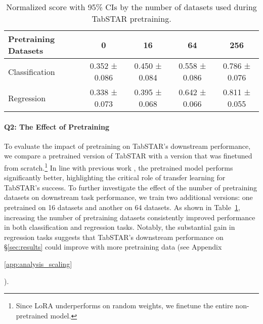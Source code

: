 \documentclass{article}
\newif\ifappendicesincluded
\newcommand{\appref}[1]{%
  \ifappendicesincluded
    \ref{#1}%
  \else
    \ref*{#1}%
  \fi
}
\begin{document}
\begin{table}[ht]
\centering
\caption{Normalized score with 95\% CIs by the number of datasets used during TabSTAR pretraining.}
\label{tab:scaling_laws}
\begin{tabular}{lcccc}
\toprule
Pretraining Datasets & 0     & 16     & 64     & 256   \\
\midrule
Classification   & 0.352 ± 0.086 & 0.450 ± 0.084  & 0.558 ± 0.086  & 0.786 ± 0.076 \\
Regression  & 0.338 ± 0.073 & 0.395 ± 0.068 & 0.642 ± 0.066 & 0.811 ± 0.055 \\
\bottomrule
\end{tabular}
\end{table}

\paragraph{Q2: The Effect of Pretraining}\label{analysis:scaling}

To evaluate the impact of pretraining on TabSTAR's downstream performance, we compare a pretrained version of TabSTAR with a version that was finetuned from scratch.\footnote{Since LoRA underperforms on random weights, we finetune the entire non-pretrained model.} In line with previous work \cite{zhu_xtab_2023, ye_towards_2024}, the pretrained model performs significantly better, highlighting the critical role of transfer learning for TabSTAR's success. To further investigate the effect of the number of pretraining datasets on downstream task performance, we train two additional versions: one pretrained on 16 datasets and another on 64 datasets. As shown in Table~\ref{tab:scaling_laws}, increasing the number of pretraining datasets consistently improved performance in both classification and regression tasks. Notably, the substantial gain in regression tasks suggests that TabSTAR's downstream performance on \S\ref{sec:results} could improve with more pretraining data (see Appendix~\appref{app:analysis_scaling}).
\end{document}
